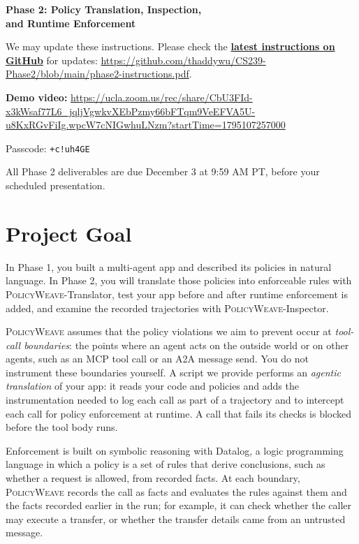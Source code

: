 \documentclass[10pt,letterpaper]{article}
\newcommand{\tool}{\textsc{PolicyWeave}}
\begin{document}
\begin{center}
  {\LARGE\bfseries Phase 2: Policy Translation, Inspection,\\[2pt]
   and Runtime Enforcement}
\end{center}
\vspace{-5pt}

We may update these instructions. Please check the
\href{https://github.com/thaddywu/CS239-Phase2/blob/main/phase2-instructions.pdf}{\textbf{latest instructions on GitHub}}
for updates: \url{https://github.com/thaddywu/CS239-Phase2/blob/main/phase2-instructions.pdf}.

\textbf{Demo video:}
\url{https://ucla.zoom.us/rec/share/CbU3FId-x3kWsaf77L6_jqljVgwkvXEbPzmy66bFTqm9VeEFVA5U-u8KxRGvFiIg.wpcW7cNIGwhuLNzm?startTime=1795107257000}

Passcode: \texttt{+c!uh4GE}

All Phase 2 deliverables are due December 3 at 9:59 AM PT, before your scheduled presentation.

\section{Project Goal}

In Phase 1, you built a multi-agent app and described its policies in natural
language. In Phase 2, you will translate those policies into enforceable rules
with {{\tool}-Translator}, test your app before and after runtime
enforcement is added, and examine the recorded trajectories with {{\tool}-Inspector}.

{\tool} assumes that the policy violations we aim to prevent occur at
\emph{tool-call boundaries}: the points where an agent acts on the outside
world or on other agents, such as an MCP tool call or an A2A message send.
You do not instrument these boundaries yourself. A script we provide performs
an \emph{agentic translation} of your app: it reads your code and policies and
adds the instrumentation needed to log each call as part of a trajectory and
to intercept each call for policy enforcement at runtime. A call that fails
its checks is blocked before the tool body runs.

Enforcement is built on symbolic reasoning with Datalog, a logic programming
language in which a policy is a set of rules that derive conclusions, such as
whether a request is allowed, from recorded facts. At each boundary, {\tool}
records the call as facts and evaluates the rules against them and the facts
recorded earlier in the run; for example, it can check whether the caller may
execute a transfer, or whether the transfer details came from an untrusted
message.
\end{document}
